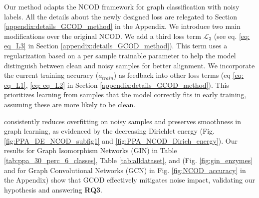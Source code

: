 

 
Our \method method adapts the NCOD framework for graph classification with noisy labels. All the details about the newly designed loss are relegated to Section \ref{appendix:details_GCOD_method} in the Appendix. We introduce two main modifications over the original NCOD.
We add a third loss term $\mathcal{L}_3$ (see eq. \eqref{eq: eq_L3}  in Section \ref{appendix:details_GCOD_method}). This term uses a regularization based on a per sample trainable parameter to help the model distinguish between clean and noisy samples for better alignment.
We incorporate the current training accuracy ($a_{ 
train}$) as feedback into other loss terms (eq \eqref{eq: eq_L1}, \ref{eq: eq_L2} in Section \ref{appendix:details_GCOD_method}). This prioritizes learning from samples that the model correctly fits in early training, assuming these are more likely to be clean.


\method consistently reduces overfitting on noisy samples and preserves smoothness in graph learning, as evidenced by the decreasing Dirichlet energy (Fig. \ref{fig:PPA_DE_NCOD_subfig1} and \ref{fig:PPA_NCOD_Dirich_energy}). Our results for Graph Isomorphism Networks (GIN) \citet{WL1} in Table \ref{tab:ppa_30_perc_6_classes}, Table \ref{tab:alldataset}, and (Fig. \ref{fig:gin_enzymes} and for Graph Convolutional Networks (GCN)  \citet{gcn} in Fig. \ref{fig:NCOD_accuracy} in the Appendix) show that GCOD effectively mitigates noise impact, validating our hypothesis and answering \textbf{RQ3}.


